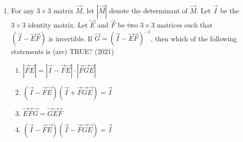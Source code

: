 \begin{enumerate}[label=\thesubsection.\arabic*.,ref=\thesubsection.\theenumi]
    \item For any $3 \times 3$ matrix $\vec{M}$, let $|\vec{M}|$ denote the determinant of $\vec{M}$. Let $\vec{I}$ be the $3 \times 3$ identity matrix. Let $\vec{E}$ and $\vec{F}$ be two $3 \times 3$ matrices such that $(\vec{I} - \vec{E}\vec{F})$ is invertible. If $\vec{G} = (\vec{I} - \vec{E}\vec{F})^{-1}$, then which of the following statements is (are) TRUE?  
    \hfill (2021)
    \begin{multicols}{2}
\begin{enumerate}
         \item $|\vec{F}\vec{E}| = |\vec{I} - \vec{F}\vec{E}| \cdot |\vec{F}\vec{G}\vec{E}|$  
         \item $(\vec{I} - \vec{F}\vec{E})(\vec{I} + \vec{F}\vec{G}\vec{E}) = \vec{I}$  
         \item $\vec{E}\vec{F}\vec{G} = \vec{G}\vec{E}\vec{F}$  
         \item $(\vec{I} - \vec{F}\vec{E})(\vec{I} - \vec{F}\vec{G}\vec{E}) = \vec{I}$
    \end{enumerate}
\end{multicols}
\end{enumerate}
